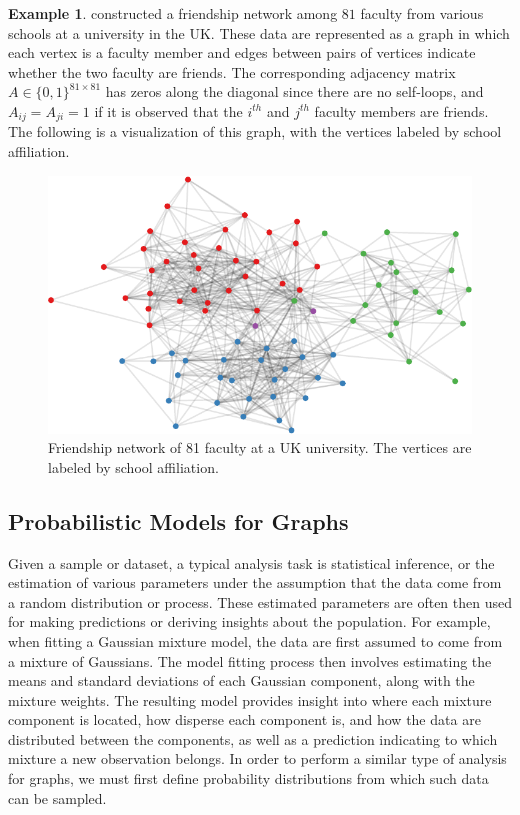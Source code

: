 \documentclass[
  12pt,
]{article}
\theoremstyle{definition}
\theoremstyle{definition}
\newtheorem{example}{Example}[section]
\theoremstyle{definition}
\theoremstyle{definition}
\theoremstyle{remark}
\begin{document}
\begin{example}
\label{ex:uk-faculty}
\citet{PhysRevE.77.016107} constructed a friendship network among $81$ faculty from various schools at a university in the UK. 
These data are represented as a graph in which each vertex is a faculty member and edges between pairs of vertices indicate whether the two faculty are friends. 
The corresponding adjacency matrix $A \in \{0, 1\}^{81 \times 81}$ has zeros along the diagonal since there are no self-loops, and $A_{ij} = A_{ji} = 1$ if it is observed that the $i^{th}$ and $j^{th}$ faculty members are friends. 
The following is a visualization of this graph, with the vertices labeled by school affiliation. 

\begin{figure}[H]

{\centering \includegraphics{draft_files/figure-latex/friendship-network-1} 

}

\caption{Friendship network of 81 faculty at a UK university. The vertices are labeled by school affiliation.}\label{fig:friendship-network}
\end{figure}
\end{example}

\hypertarget{probabilistic-models-for-graphs}{%
\subsection{Probabilistic Models for Graphs}\label{probabilistic-models-for-graphs}}

Given a sample or dataset, a typical analysis task is statistical inference, or the estimation of various parameters under the assumption that the data come from a random distribution or process.
These estimated parameters are often then used for making predictions or deriving insights about the population.
For example, when fitting a Gaussian mixture model, the data are first assumed to come from a mixture of Gaussians.
The model fitting process then involves estimating the means and standard deviations of each Gaussian component, along with the mixture weights.
The resulting model provides insight into where each mixture component is located, how disperse each component is, and how the data are distributed between the components, as well as a prediction indicating to which mixture a new observation belongs.
In order to perform a similar type of analysis for graphs, we must first define probability distributions from which such data can be sampled.
\end{document}
